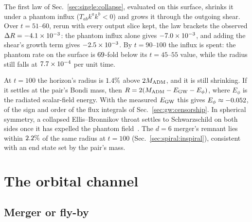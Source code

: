 \documentclass[twocolumn,floatfix,aps,prd,superscriptaddress,nofootinbib]{revtex4-2}
\begin{document}
The first law of Sec.~\ref{sec:single:collapse}, evaluated on this surface, shrinks it under a phantom influx ($T_{ab}k^ak^b<0$) and grows it through the outgoing shear. Over $t=51$--$60$, rerun with every output slice kept, the law brackets the observed $\Delta R=-4.1\times10^{-3}$: the phantom influx alone gives $-7.0\times10^{-3}$, and adding the shear's growth term gives $-2.5\times10^{-3}$. By $t=90$--$100$ the influx is spent: the phantom rate on the surface is $69$-fold below its $t=45$--$55$ value, while the radius still falls at $7.7\times10^{-4}$ per unit time.

At $t=100$ the horizon's radius is $1.4\%$ above $2M_{\rm ADM}$, and it is still shrinking. If it settles at the pair's Bondi mass, then $R=2(M_{\rm ADM}-E_{\rm GW}-E_\phi)$, where $E_\phi$ is the radiated scalar-field energy. With the measured $E_{\rm GW}$ this gives $E_\phi\approx-0.052$, of the sign and order of the flux integrals of Sec.~\ref{sec:gw:censorship}. In spherical symmetry, a collapsed Ellis--Bronnikov throat settles to Schwarzschild on both sides once it has expelled the phantom field~\cite{kain2026}. The $d=6$ merger's remnant lies within $2.2\%$ of the same radius at $t=100$ (Sec.~\ref{sec:spiral:inspiral}), consistent with an end state set by the pair's mass.

\section{The orbital channel}
\label{sec:spiral}

\subsection{Merger or fly-by}
\label{sec:spiral:capture}
\end{document}
